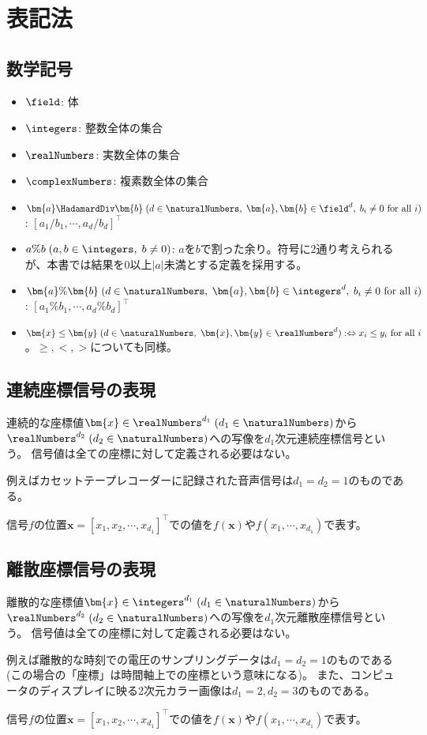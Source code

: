 \part{表記法}
	\chapter{数学記号}
		\begin{itemize}
			\item $\field$: 体
			\item $\integers$: 整数全体の集合
			\item $\realNumbers$: 実数全体の集合
			\item $\complexNumbers$: 複素数全体の集合
			\item $\bm{a} \HadamardDiv \bm{b}\;(d \in \naturalNumbers,\;\bm{a},\bm{b} \in \field^d,\;b_i\neq 0 \text{ for all }i)$: $[a_1/b_1,\cdots,a_d/b_d]^\top$
			\item $a\%b\;(a,b\in\integers,\;b\neq 0)$: $a$を$b$で割った余り。符号に2通り考えられるが、本書では結果を0以上$|a|$未満とする定義を採用する。
			\item $\bm{a}\%\bm{b}\;(d\in\naturalNumbers,\;\bm{a},\bm{b} \in \integers^d,\; b_i\neq 0 \text{ for all }i)$: $[a_1\%b_1,\cdots,a_d\%b_d]^\top$
			\item $\bm{x} \leq \bm{y}\;(d\in\naturalNumbers,\;\bm{x},\bm{y} \in \realNumbers^d) :\Leftrightarrow x_i \leq y_i \text{ for all }i$。$\geq, <, >$についても同様。
		\end{itemize}

	\chapter{連続座標信号の表現}
		連続的な座標値$\bm{x}\in\realNumbers^{d_1}\;(d_1\in\naturalNumbers)$から$\realNumbers^{d_2}\;(d_2\in\naturalNumbers)$への写像を$d_1$次元連続座標信号という。
		信号値は全ての座標に対して定義される必要はない。
		\par
		例えばカセットテープレコーダーに記録された音声信号は$d_1=d_2=1$のものである。
		\par
		信号$f$の位置$\bm{x} = [x_1,x_2,\cdots,x_{d_1}]^\top$での値を$f(\bm{x})$や$f(x_1,\cdots,x_{d_1})$で表す。

	\chapter{離散座標信号の表現}
		離散的な座標値$\bm{x}\in\integers^{d_1}\;(d_1\in\naturalNumbers)$から$\realNumbers^{d_2}\;(d_2\in\naturalNumbers)$への写像を$d_1$次元離散座標信号という。
		信号値は全ての座標に対して定義される必要はない。
		\par
		例えば離散的な時刻での電圧のサンプリングデータは$d_1=d_2=1$のものである(この場合の「座標」は時間軸上での座標という意味になる)。
		また、コンピュータのディスプレイに映る2次元カラー画像は$d_1=2,d_2=3$のものである。
		\par
		信号$f$の位置$\bm{x} = [x_1,x_2,\cdots,x_{d_1}]^\top$での値を$f(\bm{x})$や$f(x_1,\cdots,x_{d_1})$で表す。
